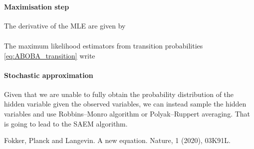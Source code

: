 \documentclass{article}
\numberwithin{equation}{section} %
\newcommand{\1}{\mathds{1}} %
\begin{document}
\paragraph{Maximisation step}

The derivative of the MLE are given by
\begin{align}

\end{align}

The maximum likelihood estimators from transition probabilities \eqref{eq:ABOBA_transition} write


\paragraph{Stochastic approximation}

Given that we are unable to fully obtain the probability distribution of the hidden variable given the observed variables, we can instead sample the hidden variables and use Robbins–Monro algorithm or Polyak–Ruppert averaging. That is going to lead to the SAEM algorithm.

\begin{thebibliography}{10}

Fokker, Planck and Langevin. A new equation. Nature, 1 (2020), 03K91L.

\end{thebibliography}
%
%
\end{document}
